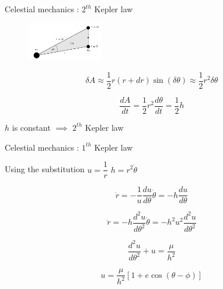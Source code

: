 \documentclass{beamer}
\begin{document}
\begin{frame}{Celestial mechanics \cite{murray1999solar}: $2^{th}$ Kepler law}

\begin{figure}[h]
\begin{center}
\includegraphics[width=0.3\textwidth]{Pic/Area_dynamics.png}
\caption{\cite{murray1999solar}}
\label{Area_dynamics}
\end{center}
\end{figure}

\begin{equation}
\delta A \approx \dfrac{1}{2} r(r+dr)\sin(\delta\theta) \approx  \dfrac{1}{2} r^{2}\delta\theta
\end{equation}

\begin{equation}
\dfrac{dA}{dt}=\dfrac{1}{2}r^{2}\dfrac{d\theta}{dt}=\dfrac{1}{2}h
\end{equation}

\begin{center}
$h$ is constant $\implies$ $2^{th}$ Kepler law
\end{center}


\end{frame}



\begin{frame}{Celestial mechanics \cite{murray1999solar}: $1^{th}$ Kepler law}
\begin{center}
Using the substitution $u=\dfrac{1}{r}$ $h=r^{2}\dot{\theta}$
\end{center}

\begin{equation}
\dot{r}=-\frac{1}{u}\dfrac{du}{d\theta}\dot{\theta}=-h\frac{du}{d\theta}
\end{equation}

\begin{equation}
\ddot{r}=-h\dfrac{d^{2}u}{d\theta^{2}}\dot{\theta}=-h^{2}u^{2}\frac{d^{2}u}{d\theta^{2}}
\end{equation}

\begin{equation}
\dfrac{d^{2}u}{d\theta^{2}}+u=\frac{\mu}{h^{2}}
\end{equation}

\begin{equation}
u=\frac{\mu}{h^{2}}\left[1+e\cos(\theta-\phi)\right]
\end{equation}

\end{frame}
\end{document}
